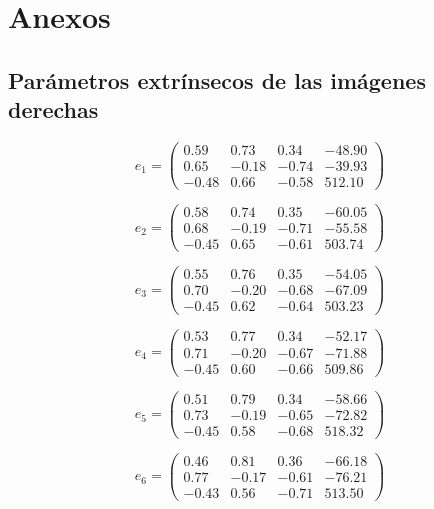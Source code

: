 \documentclass[a4paper,12pt]{article}
\begin{document}
{\appendix


\section{Anexos}

\vspace{0.5cm}

\subsection{Parámetros extrínsecos de las imágenes derechas} \label{appendix:a}

\[
e_1 = \begin{pmatrix}
0.59 & 0.73 & 0.34 & -48.90 \\
0.65 & -0.18 & -0.74 & -39.93 \\
-0.48 & 0.66 & -0.58 & 512.10
\end{pmatrix}
\]

\[
e_2 = \begin{pmatrix}
0.58 & 0.74 & 0.35 & -60.05 \\
0.68 & -0.19 & -0.71 & -55.58 \\
-0.45 & 0.65 & -0.61 & 503.74
\end{pmatrix}
\]

\[
e_3 = \begin{pmatrix}
0.55 & 0.76 & 0.35 & -54.05 \\
0.70 & -0.20 & -0.68 & -67.09 \\
-0.45 & 0.62 & -0.64 & 503.23
\end{pmatrix}
\]

\[
e_4 = \begin{pmatrix}
0.53 & 0.77 & 0.34 & -52.17 \\
0.71 & -0.20 & -0.67 & -71.88 \\
-0.45 & 0.60 & -0.66 & 509.86
\end{pmatrix}
\]

\[
e_5 = \begin{pmatrix}
0.51 & 0.79 & 0.34 & -58.66 \\
0.73 & -0.19 & -0.65 & -72.82 \\
-0.45 & 0.58 & -0.68 & 518.32
\end{pmatrix}
\]

\[
e_6 = \begin{pmatrix}
0.46 & 0.81 & 0.36 & -66.18 \\
0.77 & -0.17 & -0.61 & -76.21 \\
-0.43 & 0.56 & -0.71 & 513.50
\end{pmatrix}
\]

}
\end{document}
